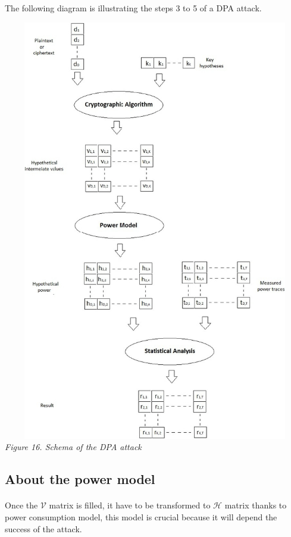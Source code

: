 The following diagram is illustrating the steps 3 to 5 of a DPA attack.
\newpage
\vspace{2cm}
\begin{center}
\includegraphics[width=140mm,height=185mm]{images/diagramCPA.jpg}\\
\textit{Figure 16. Schema of the DPA attack}
\end{center}

\newpage
\subsection{About the power model}
\label{About_the_power_model}

\paragraph*{}Once the $\mathcal{V}$ matrix is filled, 
it have to be transformed to $\mathcal{H}$ matrix
thanks to power consumption model, this model is crucial 
because it will depend the success of the attack.

